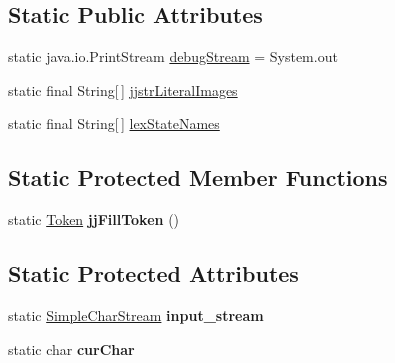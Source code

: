 \subsection*{Static Public Attributes}
\begin{DoxyCompactItemize}
\item 
static java.\+io.\+Print\+Stream \hyperlink{classpack_1_1_my_new_grammar_token_manager_a2dbf9aff8c03407417936181550b0698}{debug\+Stream} = System.\+out
\item 
static final String\mbox{[}$\,$\mbox{]} \hyperlink{classpack_1_1_my_new_grammar_token_manager_a0f57e0ac3d5944c66ce3638813cc2907}{jjstr\+Literal\+Images}
\item 
static final String\mbox{[}$\,$\mbox{]} \hyperlink{classpack_1_1_my_new_grammar_token_manager_a46273aab1da1108eab37e3c575573615}{lex\+State\+Names}
\end{DoxyCompactItemize}
\subsection*{Static Protected Member Functions}
\begin{DoxyCompactItemize}
\item 
static \hyperlink{classpack_1_1_token}{Token} {\bfseries jj\+Fill\+Token} ()\hypertarget{classpack_1_1_my_new_grammar_token_manager_a3d8ee520b60b2c3762353f6cd42e1e81}{}\label{classpack_1_1_my_new_grammar_token_manager_a3d8ee520b60b2c3762353f6cd42e1e81}

\end{DoxyCompactItemize}
\subsection*{Static Protected Attributes}
\begin{DoxyCompactItemize}
\item 
static \hyperlink{classpack_1_1_simple_char_stream}{Simple\+Char\+Stream} {\bfseries input\+\_\+stream}\hypertarget{classpack_1_1_my_new_grammar_token_manager_a8afbfb30811f07cbe11e9492d37416a1}{}\label{classpack_1_1_my_new_grammar_token_manager_a8afbfb30811f07cbe11e9492d37416a1}

\item 
static char {\bfseries cur\+Char}\hypertarget{classpack_1_1_my_new_grammar_token_manager_ac0e2ade3a06ae16b527841e56c2cad07}{}\label{classpack_1_1_my_new_grammar_token_manager_ac0e2ade3a06ae16b527841e56c2cad07}

\end{DoxyCompactItemize}

